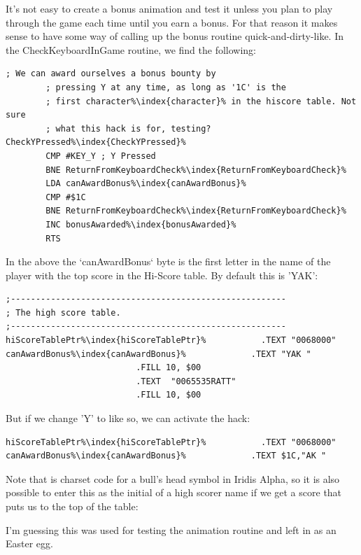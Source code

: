 \clearpage
\begin{definition}
\setlength{\intextsep}{0pt}%
\setlength{\columnsep}{3pt}%
\small
It's not easy to create a bonus animation and test it unless you plan to play through the game each time until you earn a bonus. For that
  reason it makes sense to have some way of calling up the bonus routine quick-and-dirty-like.
  In the CheckKeyboardInGame routine, we find the following:
\begin{lstlisting}[basicstyle=\tiny\ttfamily,escapechar=\%]
        ; We can award ourselves a bonus bounty by
        ; pressing Y at any time, as long as '1C' is the
        ; first character%\index{character}% in the hiscore table. Not sure
        ; what this hack is for, testing?
CheckYPressed%\index{CheckYPressed}%   
        CMP #KEY_Y ; Y Pressed
        BNE ReturnFromKeyboardCheck%\index{ReturnFromKeyboardCheck}%
        LDA canAwardBonus%\index{canAwardBonus}%
        CMP #$1C
        BNE ReturnFromKeyboardCheck%\index{ReturnFromKeyboardCheck}%
        INC bonusAwarded%\index{bonusAwarded}%
        RTS
\end{lstlisting}

In the above the `canAwardBonus` byte is the first letter in the name of the player with the top score in the Hi-Score table. By default this is 'YAK':

\begin{lstlisting}[basicstyle=\tiny\ttfamily,escapechar=\%]
;-------------------------------------------------------
; The high score table.
;-------------------------------------------------------
hiScoreTablePtr%\index{hiScoreTablePtr}%           .TEXT "0068000"
canAwardBonus%\index{canAwardBonus}%             .TEXT "YAK "
                          .FILL 10, $00
                          .TEXT  "0065535RATT"
                          .FILL 10, $00
\end{lstlisting}
But if we change 'Y' to  like so, we can activate the hack:

\begin{lstlisting}[basicstyle=\tiny\ttfamily,escapechar=\%]
hiScoreTablePtr%\index{hiScoreTablePtr}%           .TEXT "0068000"
canAwardBonus%\index{canAwardBonus}%             .TEXT $1C,"AK "
\end{lstlisting}

Note that  is charset code for a bull's head symbol in Iridis Alpha, so it is also possible to enter this as the initial of a high scorer name if we get a score that puts us to the top of the table:

%



I'm guessing this was used for testing the animation routine and left in as an Easter egg.
\end{definition}

